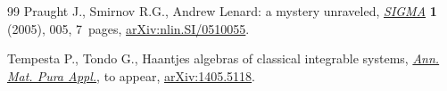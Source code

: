 \documentclass[10pt,a4paper]{amsart}
\numberwithin{equation}{section}
\begin{document}
\begin{thebibliography}{99}
Praught J., Smirnov R.G., Andrew {L}enard: a mystery unraveled, \href{https://doi.org/10.3842/SIGMA.2005.005}{\textit{SIGMA}}
 \textbf{1} (2005), 005, 7~pages, \href{https://arxiv.org/abs/nlin.SI/0510055}{arXiv:nlin.SI/0510055}.

Tempesta P., Tondo G., Haantjes algebras of classical integrable systems,
 \href{https://doi.org/10.1007/s10231-021-01107-4}{\textit{Ann. Mat. Pura Appl.}}, {t}o appear, \href{https://arxiv.org/abs/1405.5118}{arXiv:1405.5118}.

\end{thebibliography}
\end{document}
